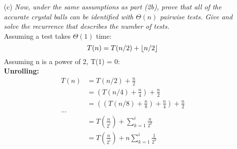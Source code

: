 \documentclass[12pt]{article} \setlength{\oddsidemargin}{0in}
\DeclarePairedDelimiter\floor{\lfloor}{\rfloor}
\begin{document}
{\begin{enumerate}
  Successive comparisons for our n=6 example:
  \begin{itemize}
    \item 1 GR 2 GR 3 GG 4 $\implies$ one or both of the first two balls is inaccurate, however if the third comparison was 'false' (that is, both balls are inaccurate) it would imply that both the 3rd and 4th balls are inaccurate. Since we know there are at most 2 inaccurate balls, we can conclude that the third comparison is 'true' and balls 3 and 4 are accurate. This implies that at least ball 2 is inaccurate. We now know the accuracy of 3 balls, and the problem is halved. 
    \item 3 GG 4 GG 5 GG 6 $\implies$ if any of these comparisons were 'false' then they would all need to be 'false', and balls 3-6 would need to be inaccurate. Since there are at most 2 inaccurate balls, all three comparisons are 'true' and we know the accuracy of balls 3-6 - the problem is now reduced to finding the accuracy of the remaining 2 balls. 
  \end{itemize}
  \pagebreak
  If we had instead 5 balls/2 comparisons, and both comparisons resulted in GR (or RR) - we would know that the rest of the comparisons would need to result in GG. Using the logic in the second example above, we would be able to reduce the problem to the first two balls. 

\item[(c)]{\textit{Now, under the same assumptions as part (2b), prove that
    all of the accurate crystal balls can be identified with
    $\Theta(n)$ pairwise tests. Give and solve the recurrence that
    describes the number of tests.}} \\
  \medskip
  Assuming a test takes $\Theta(1)$ time:
  $$T(n) = T(n/2) + \floor{n/2}$$ 
  Assuming n is a power of 2, T(1) = 0: \\
  \textbf{Unrolling:} \\

  \begin{align}
  T(n) &= T(n/2) + \frac{n}{2} \\
  &= (T(n/4) + \frac{n}{4}) + \frac{n}{2} \\
  &= ((T(n/8) + \frac{n}{8}) + \frac{n}{4}) + \frac{n}{2} \\
  ... \\
  &= T(\frac{n}{2^i}) + \sum_{k=1}^{i} \frac{n}{2^k} \\
  &= T(\frac{n}{2^i}) + n\sum_{k=1}^{i} \frac{1}{2^k}
  \end{align}


\end{enumerate}}
\end{document}
